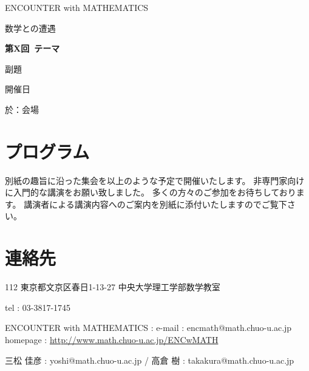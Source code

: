 \documentclass[uplatex,dvipdfmx]{jlreq}
\newcommand{\talk}[3]{%
\noindent
#1\quad #2\par
\hspace*{2em}#3\par\smallskip
}
\newcommand{\EwMnumber}{第X回}
\newcommand{\EwMtitle}{テーマ}
\newcommand{\EwMsubtitle}{副題}
\newcommand{\EwMdate}{開催日}
\newcommand{\EwMplace}{会場}
\newcommand{\EwMtitleblock}{

\vspace*{-5mm}

\begin{center}

{\Large ENCOUNTER with MATHEMATICS}

\vspace{2mm}

{\large 数学との遭遇}

\vspace{4mm}

{\Large \bfseries \EwMnumber\ \EwMtitle}

\vspace{2mm}

{\large \EwMsubtitle}

\vspace{4mm}

\EwMdate

\vspace{2mm}

於：\EwMplace

\end{center}

\vspace{3mm}

}
\begin{document}
\EwMtitleblock


\section*{プログラム}



\bigskip

別紙の趣旨に沿った集会を以上のような予定で開催いたします。  
非専門家向けに入門的な講演をお願い致しました。  
多くの方々のご参加をお待ちしております。  
講演者による講演内容へのご案内を別紙に添付いたしますのでご覧下さい。


\section*{連絡先}

112 東京都文京区春日1-13-27 中央大学理工学部数学教室

tel : 03-3817-1745

ENCOUNTER with MATHEMATICS : e-mail : encmath@math.chuo-u.ac.jp  
homepage : \url{http://www.math.chuo-u.ac.jp/ENCwMATH}

三松 佳彦 : yoshi@math.chuo-u.ac.jp / 高倉 樹 : takakura@math.chuo-u.ac.jp
\end{document}
